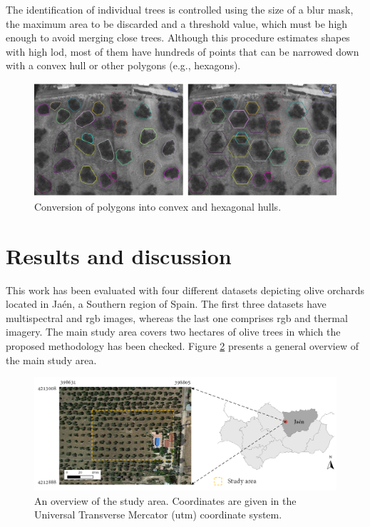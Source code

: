 The identification of individual trees is controlled using the size of a blur mask, the maximum area to be discarded and a threshold value, which must be high enough to avoid merging close trees. Although this procedure estimates shapes with high \acrshort{lod}, most of them have hundreds of points that can be narrowed down with a convex hull \cite{sklansky_finding_1982} or other polygons (e.g., hexagons). 

\begin{figure}[hbp]
    \centering
    \includegraphics[width=1\linewidth]{figs/image_fusion/convex_hull_contours.png}
    \caption{Conversion of polygons into convex and hexagonal hulls.}
    \label{fig:convex_hull_contours}
\end{figure}

\section{Results and discussion}

This work has been evaluated with four different datasets depicting olive orchards located in Jaén, a Southern region of Spain. The first three datasets have multispectral and \acrshort{rgb} images, whereas the last one comprises \acrshort{rgb} and thermal imagery. The main study area covers two hectares of olive trees in which the proposed methodology has been checked. Figure \ref{fig:image_fusion_study_area} presents a general overview of the main study area.

\begin{figure}[htb]
    \centering
    \includegraphics{figs/image_fusion/study_area.png}
    \caption{An overview of the study area. Coordinates are given in the Universal Transverse Mercator (\acrshort{utm}) coordinate system.}
    \label{fig:image_fusion_study_area}
\end{figure}

